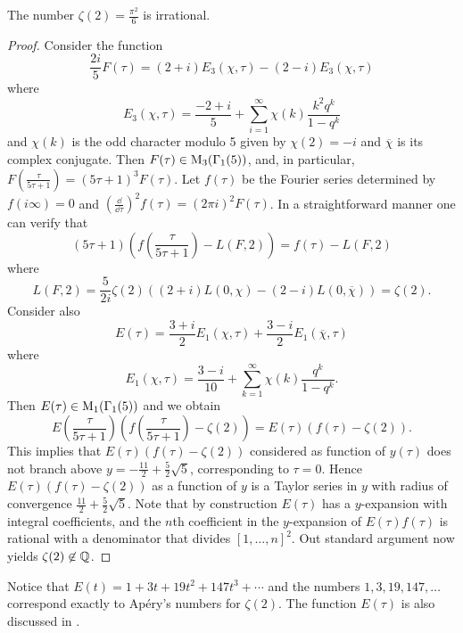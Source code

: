 \begin{theorem}
    \label{thm:5}
    The number $\zeta(2) = \frac{\pi^2}{6}$ is irrational.
    \end{theorem}
\begin{proof}
    Consider the function
    $$
        \frac{2i}{5} F(\tau) = (2 + i) E_3(\chi, \tau) - (2 - i) E_3(\chi, \tau)
    $$
    where
    $$
        E_3(\chi, \tau) = \frac{-2 + i}{5} + \sum_{i=1}^{\infty} \chi(k) \frac{k^2 q^k}{1 - q^k}
    $$
    and $\chi(k)$ is the odd character modulo 5 given by $\chi(2) = -i$ and $\overline{\chi}$ is its complex conjugate.
    Then $F(\tau) \in \mathrm{M}_3(\Gamma_1(5))$, and, in particular, $F(\frac{\tau}{5\tau + 1}) = (5\tau + 1)^{3} F(\tau)$.
    Let $f(\tau)$ be the Fourier series determined by $f(i\infty) = 0$ and $(\frac{\dd}{\dd \tau})^{2} f(\tau) = (2 \pi i)^{2} F(\tau)$.
    In a straightforward manner one can verify that
    $$
        (5\tau + 1)\left(f\left(\frac{\tau}{5\tau + 1}\right) - L(F, 2)\right)= f(\tau) - L(F, 2)
    $$
    where
    $$
        L(F, 2) = \frac{5}{2i} \zeta(2) ((2 + i)L(0, \chi) - (2 - i) L(0, \overline{\chi})) = \zeta(2).
    $$
    Consider also
    $$
        E(\tau) = \frac{3 + i}{2} E_1(\chi, \tau) + \frac{3 - i}{2} E_1(\overline{\chi}, \tau)
    $$
    where
    $$
        E_1(\chi, \tau) = \frac{3 - i}{10} + \sum_{k=1}^{\infty} \chi(k) \frac{q^k}{1 - q^k}.
    $$
    Then $E(\tau) \in \mathrm{M}_1(\Gamma_1(5))$ and we obtain
    $$
        E\left(\frac{\tau}{5\tau + 1}\right) \left(f\left(\frac{\tau}{5\tau + 1}\right) - \zeta(2)\right) = E(\tau) (f(\tau) - \zeta(2)).
    $$
    This implies that $E(\tau)(f(\tau) - \zeta(2))$ considered as function of $y(\tau)$ does not branch above $y = -\frac{11}{2} + \frac{5}{2}\sqrt{5}$, corresponding to $\tau = 0$.
    Hence $E(\tau)(f(\tau) - \zeta(2))$ as a function of $y$ is a Taylor series in $y$ with radius of convergence $\frac{11}{2} + \frac{5}{2}\sqrt{5}$.
    Note that by construction $E(\tau)$ has a $y$-expansion with integral coefficients, and the $n$th coefficient in the $y$-expansion of $E(\tau)f(\tau)$ is rational with a denominator that divides $[1, \dots, n]^{2}$.
    Out standard argument now yields $\zeta(2) \not\in \mathbb{Q}$.
\end{proof}

\begin{remark*}
Notice that $E(t) = 1 + 3t + 19 t^2 + 147 t^3 + \cdots$ and the numbers $1, 3, 19, 147, \dots$ correspond exactly to Ap\'ery's numbers for $\zeta(2)$.
The function $E(\tau)$ is also discussed in \cite[p59]{beukers1985some}.
\end{remark*}